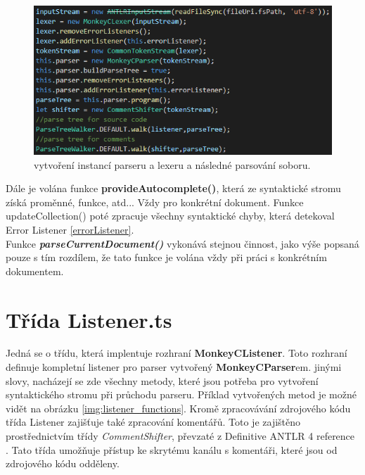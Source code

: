 \begin{figure}[]
	\centering
	\includegraphics[width=\textwidth,scale=1]{images/parsing_input}
	\caption{vytvoření instancí parseru a lexeru a následné parsování soboru.}
	\label{img:parsing_input}
\end{figure}

Dále je volána funkce \textbf{provideAutocomplete()}, která ze syntaktické stromu získá proměnné, funkce, atd... Vždy pro konkrétní dokument. Funkce updateCollection() poté zpracuje všechny syntaktické chyby, která detekoval Error Listener \ref{errorListener}.\\

Funkce \textit{\textbf{parseCurrentDocument()}} vykonává stejnou činnost, jako výše popsaná pouze s tím rozdílem, že tato funkce je volána vždy při práci s konkrétním dokumentem.

\section{Třída Listener.ts}
Jedná se o třídu, která implentuje rozhraní \textbf{MonkeyCListener}. Toto rozhraní  definuje kompletní listener pro parser vytvořený \textbf{MonkeyCParser}em. jinými slovy, nacházejí se zde všechny metody, které jsou potřeba pro vytvoření syntaktického stromu při průchodu parseru. Příklad vytvořených metod je možné vidět na obrázku \ref{img:listener_functions}. Kromě zpracovávání zdrojového kódu třída Listener zajišťuje také zpracování komentářů. Toto je zajištěno prostřednictvím třídy \textit{CommentShifter}, převzaté z Definitive ANTLR 4 reference \cite{ANTLR_2013}. Tato třída umožňuje přístup ke skrytému kanálu s komentáři, které jsou od zdrojového kódu odděleny.

